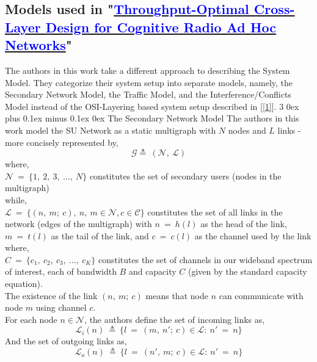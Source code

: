 \documentclass[12pt, draftcls, onecolumn]{IEEEtran}
\makeatletter
\def\subsubsection{\@startsection{subsubsection}%
                                 {3}%
                                 {\z@}%
                                 {0ex plus 0.1ex minus 0.1ex}%
                                 {0ex}%
                                 {\normalfont\normalsize\bfseries}}%
\makeatother
\begin{document}
\subsection{Models used in "\href{http://ieeexplore.ieee.org/stamp/stamp.jsp?tp=&arnumber=6881740&isnumber=7180482}{\textcolor{blue}{Throughput-Optimal Cross-Layer Design for Cognitive Radio Ad Hoc Networks}}"}
The authors in this work take a different approach to describing the System Model. They categorize their system setup into separate models, namely, the Secondary Network Model, the Traffic Model, and the Interference/Conflicts Model instead of the OSI-Layering based system setup described in [\ref{1}].
\subsubsection{The Secondary Network Model}
The authors in this work model the SU Network as a static multigraph with $N$ nodes and $L$ links - more concisely represented by,
\[\mathcal{G} \triangleq\ (\mathcal{N},\ \mathcal{L})\] 
where,
\\$\mathcal{N}\ =\ \{1,\ 2,\ 3,\ ...,\ N\}$ constitutes the set of secondary users (nodes in the multigraph)
\\while, 
\\$\mathcal{L}\ =\ \{(n,\ m;\ c),\ n,\ m \in \mathcal{N}, c \in \mathcal{C}\}$ constitutes the set of all links in the network (edges of the multigraph) with $n\ =\ h(l)$ as the head of the link, $m\ =\ t(l)$ as the tail of the link, and $c\ =\ c(l)$ as the channel used by the link
\\where, 
\\$C\ =\ \{c_1,\ c_2,\ c_3,\ ...,\ c_K\}$ constitutes the set of channels in our wideband spectrum of interest, each of bandwidth $B$ and capacity $C$ (given by the standard capacity equation).
\\The existence of the link $(n,\ m;\ c)$ means that node $n$ can communicate with node $m$ using channel $c$.
\\For each node $n \in \mathcal{N}$, the authors define the set of incoming links as,
\[\mathcal{L}_i(n)\ \triangleq\ \{l\ =\ (m,\ n';\ c) \in \mathcal{L}:\ n'\ =\ n\}\]
And the set of outgoing links as,
\[\mathcal{L}_o(n)\ \triangleq\ \{l\ =\ (n',\ m;\ c) \in \mathcal{L}:\ n'\ =\ n\}\]
\end{document}
